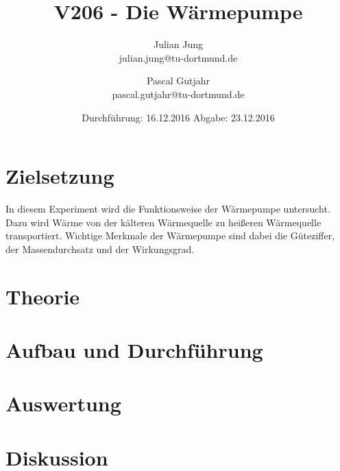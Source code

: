 

\title{V206 - Die Wärmepumpe}
\author{Julian Jung \\ julian.jung@tu-dortmund.de
  \and Pascal Gutjahr \\ pascal.gutjahr@tu-dortmund.de}
  \date{Durchführung: 16.12.2016
  \hspace{3em}
  Abgabe: 23.12.2016}
  
\maketitle
\newpage
\tableofcontents
\newpage
\section{Zielsetzung}
In diesem Experiment wird die Funktionsweise der Wärmepumpe untersucht. Dazu wird
Wärme von der kälteren Wärmequelle zu heißeren Wärmequelle transportiert. Wichtige
Merkmale der Wärmepumpe sind dabei die Güteziffer, der Massendurchsatz und der
Wirkungsgrad.
\section{Theorie}
 
\section{Aufbau und Durchführung}
 
\section{Auswertung}
 
\section{Diskussion}
 
\printbibliography

